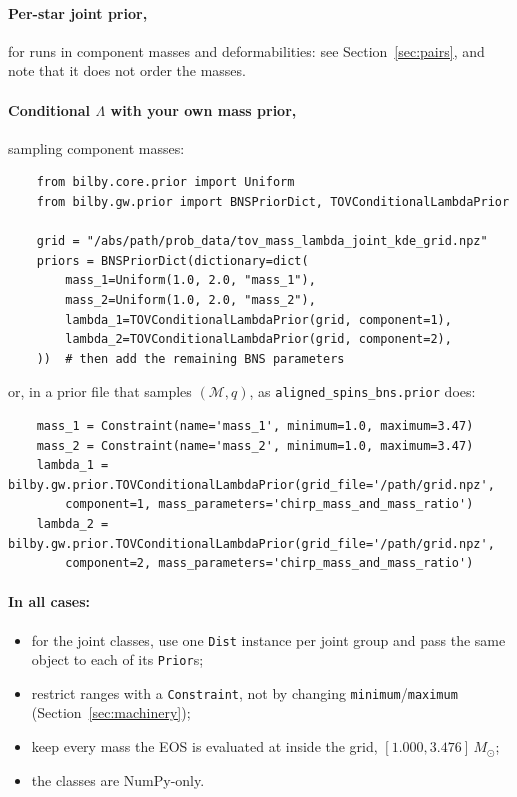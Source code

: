 \documentclass[11pt,a4paper]{article}
\newcommand{\Mc}{\mathcal{M}}
\newcommand{\code}[1]{\texttt{#1}}
\begin{document}
\paragraph{Per-star joint prior,} for runs in component masses and deformabilities:
see Section~\ref{sec:pairs}, and note that it does not order the masses.

\paragraph{Conditional $\Lambda$ with your own mass prior,} sampling component
masses:
\begin{verbatim}
    from bilby.core.prior import Uniform
    from bilby.gw.prior import BNSPriorDict, TOVConditionalLambdaPrior

    grid = "/abs/path/prob_data/tov_mass_lambda_joint_kde_grid.npz"
    priors = BNSPriorDict(dictionary=dict(
        mass_1=Uniform(1.0, 2.0, "mass_1"),
        mass_2=Uniform(1.0, 2.0, "mass_2"),
        lambda_1=TOVConditionalLambdaPrior(grid, component=1),
        lambda_2=TOVConditionalLambdaPrior(grid, component=2),
    ))  # then add the remaining BNS parameters
\end{verbatim}
or, in a prior file that samples $(\Mc, q)$, as \code{aligned\_spins\_bns.prior}
does:
\begin{verbatim}
    mass_1 = Constraint(name='mass_1', minimum=1.0, maximum=3.47)
    mass_2 = Constraint(name='mass_2', minimum=1.0, maximum=3.47)
    lambda_1 = bilby.gw.prior.TOVConditionalLambdaPrior(grid_file='/path/grid.npz',
        component=1, mass_parameters='chirp_mass_and_mass_ratio')
    lambda_2 = bilby.gw.prior.TOVConditionalLambdaPrior(grid_file='/path/grid.npz',
        component=2, mass_parameters='chirp_mass_and_mass_ratio')
\end{verbatim}

\paragraph{In all cases:}
\begin{itemize}
  \item for the joint classes, use one \code{Dist} instance per joint group and
    pass the same object to each of its \code{Prior}s;
  \item restrict ranges with a \code{Constraint}, not by changing
    \code{minimum}/\code{maximum} (Section~\ref{sec:machinery});
  \item keep every mass the EOS is evaluated at inside the grid,
    $[1.000, 3.476]\,M_\odot$;
  \item the classes are NumPy-only.
\end{itemize}
\end{document}
